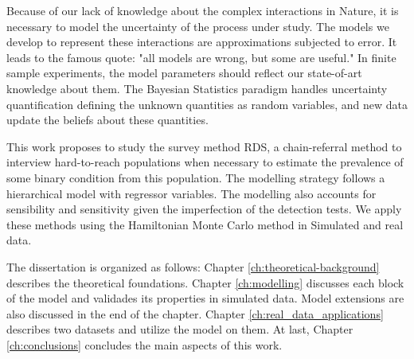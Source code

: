 Because of our lack of knowledge about the complex interactions in Nature, it
is necessary to model the uncertainty of the process under study. The models
we develop to represent these interactions are approximations subjected to
error. It leads to the famous quote: "all models are wrong, but some are
useful." In finite sample experiments, the model parameters should reflect our
state-of-art knowledge about them. The Bayesian Statistics paradigm handles
uncertainty quantification defining the unknown quantities as random
variables, and new data update the beliefs about these quantities.  

This work proposes to study the survey method RDS, a chain-referral method to
interview hard-to-reach populations when necessary to estimate the prevalence
of some binary condition from this population. The modelling strategy follows
a hierarchical model with regressor variables. The modelling also accounts for
sensibility and sensitivity given the imperfection of the detection tests. We
apply these methods using the Hamiltonian Monte Carlo method in Simulated and
real data.

The dissertation is organized as follows: Chapter \ref{ch:theoretical-background}
describes the theoretical foundations. Chapter \ref{ch:modelling} discusses
each block of the model and validades its properties in simulated data. Model
extensions are also discussed in the end of the chapter.
Chapter \ref{ch:real_data_applications} describes two datasets and utilize the
model on them. At last, Chapter \ref{ch:conclusions} concludes the main aspects of
this work.